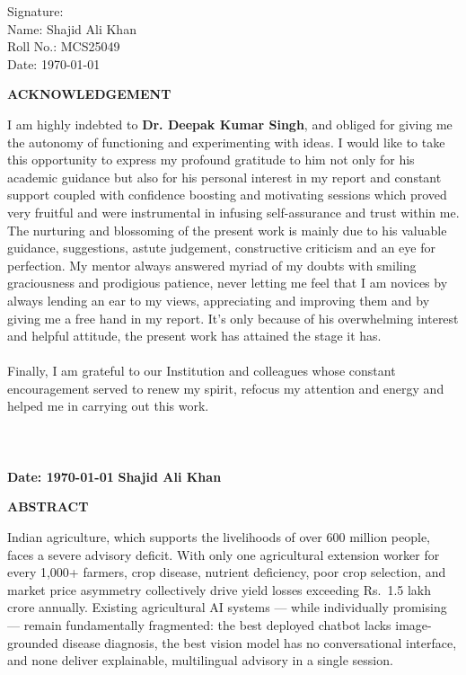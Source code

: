\documentclass[12pt,a4paper]{article}
\providecommand{\textrupee}{Rs.~}
\begin{document}
\noindent Signature:\vspace{1cm}\\
Name: Shajid Ali Khan\\
Roll No.: MCS25049\\
Date: \today\\
\clearpage
\begin{center}
{\large \bf ACKNOWLEDGEMENT}
\end{center}
I am highly indebted to {\bf Dr. Deepak Kumar Singh}, and obliged for giving me the autonomy of functioning and experimenting with ideas. I would like to take this opportunity to express my profound gratitude to him
not only for his academic guidance but also for his personal interest in my report and constant support coupled with confidence boosting and motivating sessions which proved very fruitful and were instrumental in infusing self-assurance and trust within me. The nurturing and blossoming of the present work is mainly due to his valuable guidance,
suggestions, astute judgement, constructive criticism and an eye for perfection. My mentor always answered myriad of my doubts with smiling graciousness and prodigious patience, never letting me feel that I am novices by always lending an ear to my views, appreciating and improving them and by giving me a free hand in my report. It's only because of his overwhelming interest and helpful attitude, the present work has attained the stage it has. \\
\\
Finally, I am grateful to our Institution and colleagues whose constant encouragement served to renew my spirit, refocus my attention and energy and helped me in carrying out this work.\\ \\ \\ \\
\vspace{0.7in}
\textbf{Date: \today}
\hfill
\textbf{Shajid Ali Khan}
\clearpage
\begin{center}
{\large \bf ABSTRACT}
\end{center}

Indian agriculture, which supports the livelihoods of over 600 million people, faces a severe advisory deficit. With only one agricultural extension worker for every 1,000+ farmers, crop disease, nutrient deficiency, poor crop selection, and market price asymmetry collectively drive yield losses exceeding \textrupee{}1.5 lakh crore annually. Existing agricultural AI systems --- while individually promising --- remain fundamentally fragmented: the best deployed chatbot lacks image-grounded disease diagnosis, the best vision model has no conversational interface, and none deliver explainable, multilingual advisory in a single session.
\end{document}
